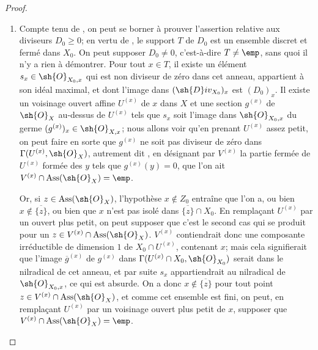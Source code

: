 \begin{proof}
\begin{enumerate}[label=(\roman*)]
  \item Compte tenu de , on peut se borner à prouver l'assertion relative aux diviseurs $D_0\geq0$;
en vertu de , le support $T$ de $D_0$ est un ensemble discret et fermé dans $X_0$.
On peut supposer $D_0\neq0$, c'est-à-dire $T\neq\emp$, sans quoi il n'y a rien à démontrer.
Pour tout $x\in T$, il existe un élément $s_x\in\sh{O}_{X_0,x}$ qui est non diviseur de zéro dans cet anneau, appartient à son idéal maximal, et dont l'image dans $(\sh{D}iv_{X_0})_x$ est $(D_0)_x$.
Il existe un voisinage ouvert affine $U^{(x)}$ de $x$ dans $X$ et une section $g^{(x)}$ de $\sh{O}_X$ au-dessus de $U^{(x)}$ tels que $s_x$ soit l'image dans $\sh{O}_{X_0,x}$ du germe $(g^{(x)})_x\in\sh{O}_{X,x}$;
nous allons voir qu'en prenant $U^{(x)}$ assez petit, on peut faire en sorte que $g^{(x)}$ ne soit pas diviseur de zéro dans $\Gamma(U^{(x)},\sh{O}_X)$, autrement dit , en désignant par $V^{(x)}$ la partie fermée de $U^{(x)}$ formée des $y$ tels que $g^{(x)}(y)=0$, que l'on ait $V^{(x)}\cap\operatorname{Ass}(\sh{O}_X)=\emp$.

Or, si $z\in\operatorname{Ass}(\sh{O}_X)$, l'hypothèse $x\notin Z_0$ entraîne que l'on a, ou bien $x\notin\overline{\{z\}}$, ou bien que $x$ n'est pas isolé dans $\overline{\{z\}}\cap X_0$.
En remplaçant $U^{(x)}$ par un ouvert plus petit, on peut supposer que c'est le second cas qui se produit pour un $z\in V^{(x)}\cap\operatorname{Ass}(\sh{O}_X)$.
$V^{(x)}$ contiendrait donc une composante irréductible de dimension $1$ de $X_0\cap U^{(x)}$, contenant $x$;
mais cela signifierait que l'image $\overline{g}^{(x)}$ de $g^{(x)}$ dans $\Gamma(U^{(x)}\cap X_0,\sh{O}_{X_0})$ serait dans le nilradical de cet anneau, et par suite $s_x$ appartiendrait au nilradical de $\sh{O}_{X_0,x}$, ce qui est absurde.
On a donc $x\notin\overline{\{z\}}$ pour tout point $z\in V^{(x)}\cap\operatorname{Ass}(\sh{O}_X)$, et comme cet ensemble est fini, on peut, en remplaçant $U^{(x)}$ par un voisinage ouvert plus petit de $x$, supposer que $V^{(x)}\cap\operatorname{Ass}(\sh{O}_X)=\emp$.


\end{enumerate}
\end{proof}
